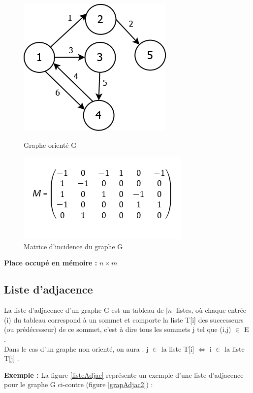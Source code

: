 \begin{figure}[H]
	\begin{minipage}[c]{.46\linewidth}
	\begin{center}
		\includegraphics[height=100 pt, width=110 pt]{./ressources/image/graphIncid.png} 
		\caption{Graphe orienté G}
		\label{grapIncid}
	\end{center}
	\end{minipage} 
	\begin{minipage}[c]{.46\linewidth}
	\begin{center}
		\includegraphics[height=110 pt, width=140 pt]{./ressources/image/matriceIncid.png} 
		\caption{Matrice d'incidence du graphe G}
		\label{matriceIncid}
	\end{center}
	\end{minipage} 
\end{figure}

\textbf{Place occupé en mémoire :} $n \times m$
		
		\subsection{Liste d'adjacence}
			La liste d'adjacence d'un graphe G est un tableau de $|n|$ listes, où chaque entrée (i) du tableau correspond à un sommet et comporte la liste T[i] des successeurs (ou prédécesseur) de ce sommet, c'est à dire tous les sommets j tel que (i,j) $\in$ E \citep{mathieu}.\\
Dans le cas d'un graphe non orienté, on aura : j $\in$ la liste T[i]  $\iff$ i $\in$ la liste T[j] \citep{IUTLyonInformatique}.

\textbf{Exemple :} La figure \ref{listeAdjac} représente 					un exemple d'une liste d'adjacence pour le graphe G ci-contre 			(figure \ref{grapAdjac2}) :
			
